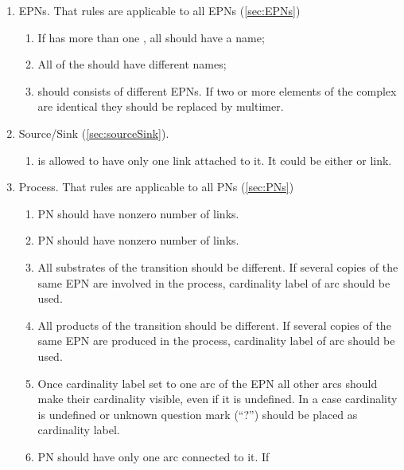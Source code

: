 \begin{enumerate}
  \item EPNs. That rules are applicable to all EPNs (\ref{sec:EPNs})
  \begin{enumerate}
    \item If  has more than one , 
    all  should have a name;
    \item All  of the  should have 
    different names;
    \item {} should consists of different EPNs. If two or more 
    elements of the complex are identical they should be replaced by multimer. 
  \end{enumerate}
  \item Source/Sink (\ref{sec:sourceSink}).
  \begin{enumerate}
    \item {} is allowed to have only one link attached to it. It
    could be either  or  link.
  \end{enumerate}
    \item Process. That rules are applicable to all PNs (\ref{sec:PNs})
  \begin{enumerate}
    \item PN should have nonzero number of  links.
    \item PN should have nonzero number of  links.
    \item All substrates of the transition should be different. If several 
    copies of the same EPN are involved in the process, cardinality label of 
     arc should be used.
    \item All products of the transition should be different. If several copies 
    of the same EPN are produced in the process, cardinality label of 
     arc should be used.
    \item Once cardinality label set to one arc of the EPN all other arcs should
    make their cardinality visible, even if it is undefined. In a case
    cardinality is undefined or unknown question mark (``?'') should be placed as cardinality label. 
    \item PN should have only one  arc connected to it. If

\end{enumerate}
\end{enumerate}
